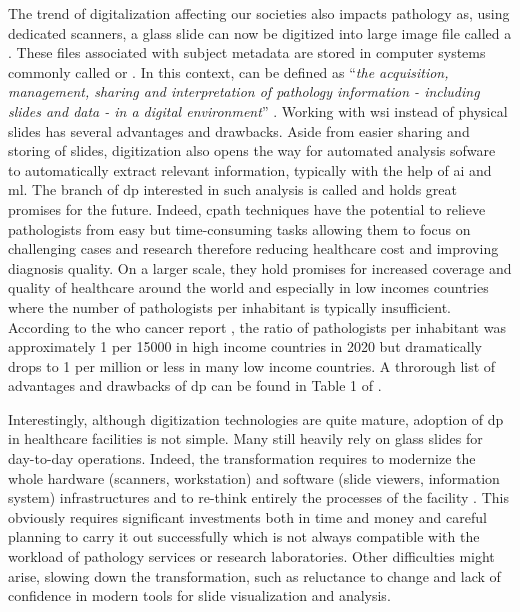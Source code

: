 The trend of digitalization affecting our societies also impacts pathology as, using dedicated scanners, a glass slide can now be digitized into large image file called a . These files associated with subject metadata are stored in computer systems commonly called  or . In this context,  can be defined as ``\textit{the acquisition, management, sharing and interpretation of pathology information - including slides and data - in a digital environment}'' \cite{doolan2019whatisdp}. Working with \acrshort{wsi} instead of physical slides has several advantages and drawbacks. Aside from easier sharing and storing of slides, digitization also opens the way for automated analysis sofware to automatically extract relevant information, typically with the help of \acrlong{ai} and \acrlong{ml}. The branch of \acrlong{dp} interested in such analysis is called  and holds great promises for the future. Indeed, \acrlong{cpath} techniques have the potential to relieve pathologists from easy but time-consuming tasks allowing them to focus on challenging cases and research therefore reducing healthcare cost and improving diagnosis quality. On a larger scale, they hold promises for increased coverage and quality of healthcare around the world and especially in low incomes countries where the number of pathologists per inhabitant is typically insufficient. According to the \acrshort{who} cancer report \cite{world2020report}, the ratio of pathologists per inhabitant was approximately 1 per 15000 in high income countries in 2020 but dramatically drops to 1 per million or less in many low income countries. A throrough list of advantages and drawbacks of \acrlong{dp} can be found in Table 1 of \cite{jahn2020digital}.

Interestingly, although digitization technologies are quite mature, adoption of \acrlong{dp} in healthcare facilities is not simple. Many still heavily rely on glass slides for day-to-day operations. Indeed, the transformation requires to modernize the whole hardware (scanners, workstation) and software (slide viewers, information system) infrastructures and to re-think entirely the processes of the facility \cite{stathonikos2013going, eloy2021digital, temprana2022digipatics}. This obviously requires significant investments both in time and money and careful planning to carry it out successfully which is not always compatible with the workload of pathology services or research laboratories. Other difficulties might arise, slowing down the transformation, such as reluctance to change and lack of confidence in modern tools for slide visualization and analysis. 

